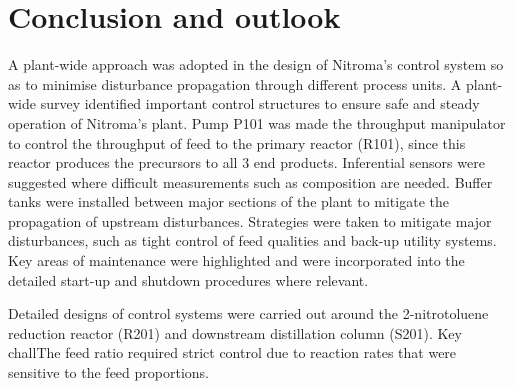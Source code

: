 \section{Conclusion and outlook}
A plant-wide approach was adopted in the design of Nitroma's control system so as to minimise disturbance propagation through different process units. A plant-wide survey identified important control structures to ensure safe and steady operation of Nitroma's plant. Pump P101 was made the throughput manipulator to control the throughput of feed to the primary reactor (R101), since this reactor produces the precursors to all 3 end products. Inferential sensors were suggested where difficult measurements such as composition are needed. Buffer tanks were installed between major sections of the plant to mitigate the propagation of upstream disturbances. Strategies were taken to mitigate major disturbances, such as tight control of feed qualities and back-up utility systems. Key areas of maintenance were highlighted and were incorporated into the detailed start-up and shutdown procedures where relevant.

Detailed designs of control systems were carried out around the 2-nitrotoluene reduction reactor (R201) and downstream distillation column (S201). Key challThe feed ratio required strict control due to reaction rates that were sensitive to the feed proportions.  